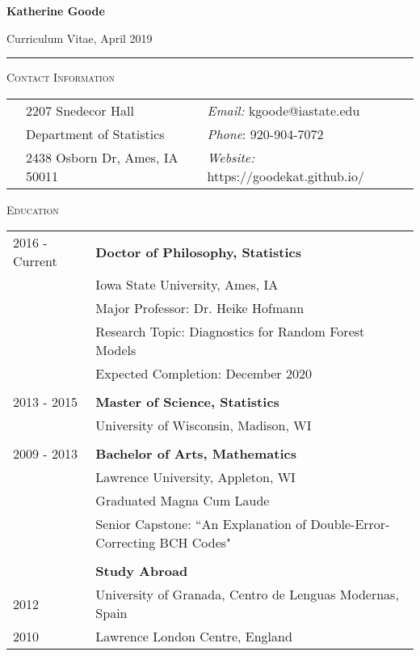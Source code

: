 \documentclass[10pt, oneside]{article}
\begin{document}
\begin{LARGE} \noindent\textbf{Katherine Goode} \end{LARGE} \hfill Curriculum Vitae, April 2019\\
\rule{\textwidth}{1pt}

\vspace{0.25cm}

\noindent \textsc{Contact Information} \hrulefill
\begin{longtable}{p{2.5cm}p{7cm}p{7cm}}
& 2207 Snedecor Hall & \emph{Email:} kgoode@iastate.edu\\
& Department of Statistics & \emph{Phone}: 920-904-7072\\
& 2438 Osborn Dr, Ames, IA 50011 & \emph{Website:} https://goodekat.github.io/
\end{longtable}

\noindent \textsc{Education} \hrulefill
\begin{longtable}{p{2.5cm}p{14cm}}
\hfill{2016 - Current} & \textbf{Doctor of Philosophy, Statistics}\\
& Iowa State University, Ames, IA\\
& Major Professor: Dr. Heike Hofmann\\
& Research Topic: Diagnostics for Random Forest Models\\
& Expected Completion: December 2020\\
\\
\hfill{2013 - 2015} & \textbf{Master of Science, Statistics}\\
& University of Wisconsin, Madison, WI\\
\\
\hfill{2009 - 2013} & \textbf{Bachelor of Arts, Mathematics}\\
& Lawrence University, Appleton, WI\\
& Graduated Magna Cum Laude\\
& Senior Capstone: ``An Explanation of Double-Error-Correcting BCH Codes"\\
\\
& \textbf{Study Abroad}\\
\hfill{2012} & \indent University of Granada, Centro de Lenguas Modernas, Spain\\
\hfill{2010} & \indent Lawrence London Centre, England
\end{longtable}
\end{document}
